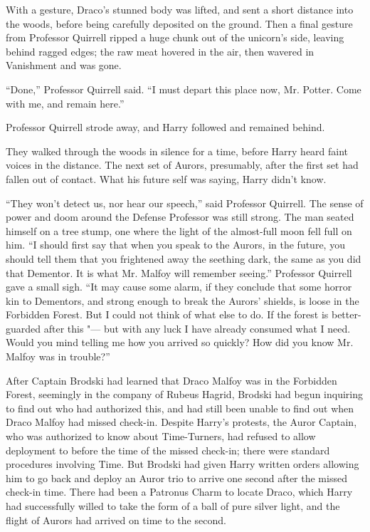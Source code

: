 With a gesture, Draco's stunned body was lifted, and sent a short
distance into the woods, before being carefully deposited on the ground.
Then a final gesture from Professor Quirrell ripped a huge chunk out of
the unicorn's side, leaving behind ragged edges; the raw meat hovered in
the air, then wavered in Vanishment and was gone.

``Done,'' Professor Quirrell said. ``I must depart this place now, Mr.
Potter. Come with me, and remain here.''

Professor Quirrell strode away, and Harry followed and remained behind.

They walked through the woods in silence for a time, before Harry heard
faint voices in the distance. The next set of Aurors, presumably, after
the first set had fallen out of contact. What his future self was
saying, Harry didn't know.

``They won't detect us, nor hear our speech,'' said Professor Quirrell.
The sense of power and doom around the Defense Professor was still
strong. The man seated himself on a tree stump, one where the light of
the almost-full moon fell full on him. ``I should first say that when
you speak to the Aurors, in the future, you should tell them that you
frightened away the seething dark, the same as you did that Dementor. It
is what Mr. Malfoy will remember seeing.'' Professor Quirrell gave a
small sigh. ``It may cause some alarm, if they conclude that some horror
kin to Dementors, and strong enough to break the Aurors' shields, is
loose in the Forbidden Forest. But I could not think of what else to do.
If the forest is better-guarded after this "--- but with any luck I have
already consumed what I need. Would you mind telling me how you arrived
so quickly? How did you know Mr. Malfoy was in trouble?''

After Captain Brodski had learned that Draco Malfoy was in the Forbidden
Forest, seemingly in the company of Rubeus Hagrid, Brodski had begun
inquiring to find out who had authorized this, and had still been unable
to find out when Draco Malfoy had missed check-in. Despite Harry's
protests, the Auror Captain, who was authorized to know about
Time-Turners, had refused to allow deployment to before the time of the
missed check-in; there were standard procedures involving Time. But
Brodski had given Harry written orders allowing him to go back and
deploy an Auror trio to arrive one second after the missed check-in
time. There had been a Patronus Charm to locate Draco, which Harry had
successfully willed to take the form of a ball of pure silver light, and
the flight of Aurors had arrived on time to the second.

